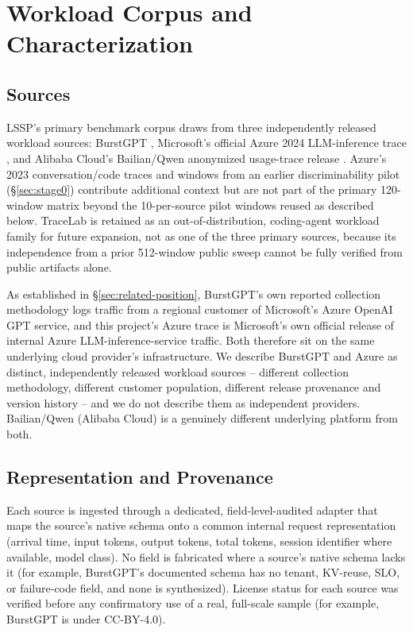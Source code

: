 \section{Workload Corpus and Characterization}
\label{sec:workloads}

\subsection{Sources}
\label{sec:sources}

LSSP's primary benchmark corpus draws from three independently released
workload sources: BurstGPT \citep{burstgpt2025}, Microsoft's official Azure
2024 LLM-inference trace \citep{azure2024trace,stojkovic2025dynamollm}, and
Alibaba Cloud's Bailian/Qwen anonymized usage-trace
release \citep{bailianqwen2026}. Azure's 2023 conversation/code traces
\citep{patel2024splitwise} and windows from an earlier discriminability
pilot (\S\ref{sec:stage0}) contribute additional context but are not part
of the primary 120-window matrix beyond the 10-per-source pilot windows
reused as described below. TraceLab \citep{tracelab2026} is retained as an
out-of-distribution, coding-agent workload family for future expansion,
not as one of the three primary sources, because its independence from a
prior 512-window public sweep cannot be fully verified from public
artifacts alone.

As established in \S\ref{sec:related-position}, BurstGPT's own reported
collection methodology logs traffic from a regional customer of Microsoft's
Azure OpenAI GPT service, and this project's Azure trace is Microsoft's own
official release of internal Azure LLM-inference-service traffic. Both
therefore sit on the same underlying cloud provider's infrastructure. We
describe BurstGPT and Azure as distinct, independently released workload
sources -- different collection methodology, different customer
population, different release provenance and version history -- and we do
not describe them as independent providers. Bailian/Qwen (Alibaba Cloud)
is a genuinely different underlying platform from both.

\subsection{Representation and Provenance}
\label{sec:provenance}

Each source is ingested through a dedicated, field-level-audited adapter that maps the source's native
schema onto a common internal request representation (arrival time, input
tokens, output tokens, total tokens, session identifier where available,
model class). No field is fabricated where a source's native schema lacks
it (for example, BurstGPT's documented schema has no tenant, KV-reuse, SLO,
or failure-code field, and none is synthesized). License status for each source was verified before any confirmatory use of a real, full-scale sample (for example, BurstGPT is under CC-BY-4.0).

